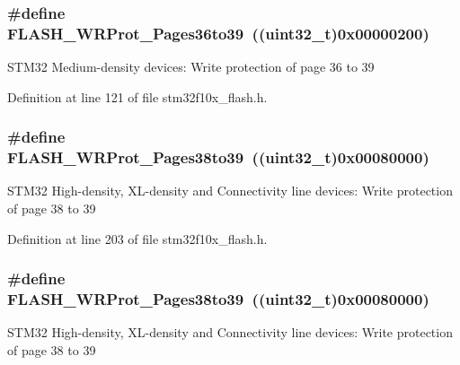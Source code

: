 \subsubsection[{\texorpdfstring{F\+L\+A\+S\+H\+\_\+\+W\+R\+Prot\+\_\+\+Pages36to39}{FLASH_WRProt_Pages36to39}}]{\setlength{\rightskip}{0pt plus 5cm}\#define F\+L\+A\+S\+H\+\_\+\+W\+R\+Prot\+\_\+\+Pages36to39~(({\bf uint32\+\_\+t})0x00000200)}\hypertarget{group___option___bytes___write___protection_ga783f47425af52b9a12914520d9ee175e}{}\label{group___option___bytes___write___protection_ga783f47425af52b9a12914520d9ee175e}
S\+T\+M32 Medium-\/density devices\+: Write protection of page 36 to 39 

Definition at line 121 of file stm32f10x\+\_\+flash.\+h.

\subsubsection[{\texorpdfstring{F\+L\+A\+S\+H\+\_\+\+W\+R\+Prot\+\_\+\+Pages38to39}{FLASH_WRProt_Pages38to39}}]{\setlength{\rightskip}{0pt plus 5cm}\#define F\+L\+A\+S\+H\+\_\+\+W\+R\+Prot\+\_\+\+Pages38to39~(({\bf uint32\+\_\+t})0x00080000)}\hypertarget{group___option___bytes___write___protection_gacd33bf5c4a305a271da6035ed19cefc2}{}\label{group___option___bytes___write___protection_gacd33bf5c4a305a271da6035ed19cefc2}
S\+T\+M32 High-\/density, X\+L-\/density and Connectivity line devices\+: Write protection of page 38 to 39 

Definition at line 203 of file stm32f10x\+\_\+flash.\+h.

\subsubsection[{\texorpdfstring{F\+L\+A\+S\+H\+\_\+\+W\+R\+Prot\+\_\+\+Pages38to39}{FLASH_WRProt_Pages38to39}}]{\setlength{\rightskip}{0pt plus 5cm}\#define F\+L\+A\+S\+H\+\_\+\+W\+R\+Prot\+\_\+\+Pages38to39~(({\bf uint32\+\_\+t})0x00080000)}\hypertarget{group___option___bytes___write___protection_gacd33bf5c4a305a271da6035ed19cefc2}{}\label{group___option___bytes___write___protection_gacd33bf5c4a305a271da6035ed19cefc2}
S\+T\+M32 High-\/density, X\+L-\/density and Connectivity line devices\+: Write protection of page 38 to 39 

